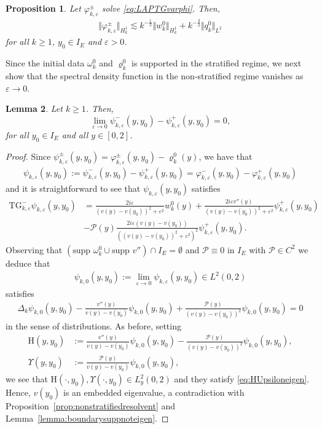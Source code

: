 \documentclass[11pt,reqno]{amsproc}
\newtheorem{proposition}{Proposition}[section]
\newtheorem{lemma}[proposition]{Lemma}
\theoremstyle{definition}
\numberwithin{equation}{section}
\newcommand{\D}{{\Delta}}
\renewcommand{\sp}{{\text{supp }}}
\newcommand{\ep}{\varepsilon}
\renewcommand{\P}{{\mathcal{P}}}
\begin{document}
\begin{proposition}\label{prop:Hk1varphi}
Let $\varphi_{k,\ep}^\pm$ solve \eqref{eq:LAPTGvarphi}. Then,
\begin{align*}
\Vert \varphi_{k,\ep}^\pm \Vert_{H_k^1}\lesssim k^{-\frac13}\Vert w_k^0\Vert_{H_k^1} + k^{-\frac32}\Vert q_k^0 \Vert_{L^2}
\end{align*}
for all $k\geq 1$, $y_0\in I_E$ and $\ep>0$. 
\end{proposition}
Since the initial data $\omega_k^0$ and $\varrho_k^0$ is supported in the stratified regime, we next show that the spectral density function in the non-stratified regime vanishes as $\ep\rightarrow 0$.
\begin{lemma}\label{lemma:vanishingpsiIE}
Let $k\geq 1$. Then,
\begin{equation*}
\lim_{\ep \rightarrow 0}\psi_{k,\ep}^-(y,y_0) - \psi_{k,\ep}^+(y,y_0) = 0,
\end{equation*}
for all $y_0\in I_E$ and all $y\in [0,2]$.
\end{lemma}

\begin{proof}
Since $\psi_{k,\ep}^\pm(y,y_0) = \varphi_{k,\ep}^\pm(y,y_0) - \varrho_k^0(y)$, we have that
\begin{align*}
\psi_{k,\ep}(y,y_0) := \psi_{k,\ep}^-(y,y_0) - \psi_{k,\ep}^+(y,y_0) = \varphi_{k,\ep}^-(y,y_0) - \varphi_{k,\ep}^+(y,y_0)
\end{align*}
and it is straightforward to see that $\psi_{k,\ep}(y,y_0)$ satisfies
\begin{align*}
\text{TG}_{k,\ep}^-\psi_{k,\ep}(y,y_0) &= \frac{2i\ep}{(v(y) - v(y_0))^2 + \ep^2}w_k^0(y) + \frac{2i\ep v''(y)}{(v(y) - v(y_0))^2 + \ep^2}\psi_{k,\ep}^+(y,y_0) \\
&-\P(y)\frac{2i\ep(v(y) - v(y_0))}{((v(y)-v(y_0))^2 + \ep^2)^2}\psi_{k,\ep}^+(y,y_0).
\end{align*}
Observing that $(\sp \omega_k^0 \cup \sp v'' )\cap I_E = \emptyset$ and $\P\equiv 0$ in $I_E$ with $\P\in C^2$ we deduce that
\begin{align*}
\psi_{k,0}(y,y_0) := \lim_{\ep\rightarrow 0}\psi_{k,\ep}(y,y_0) \in L^2(0,2)
\end{align*}
satisfies
\begin{align*}
\D_k\psi_{k,0}(y,y_0) - \frac{v''(y)}{v(y) - v(y_0)}\psi_{k,0}(y,y_0) + \frac{\P(y)}{(v(y) - v(y_0))^2}\psi_{k,0}(y,y_0) = 0
\end{align*}
in the sense of distributions. As before, setting 
\begin{align*}
\mathrm H(y,y_0) &:= \frac{v''(y)}{v(y) - v(y_0)}\psi_{k,0}(y,y_0) - \frac{\P(y)}{(v(y) - v(y_0))^2}\psi_{k,0}(y,y_0), \\ 
\Upsilon(y,y_0) &:= \frac{\P(y)}{v(y) - v(y_0)}\psi_{k,0}(y,y_0),
\end{align*}
we see that $\mathrm H(\cdot,y_0),\Upsilon(\cdot,y_0) \in L^2_y(0,2)$ and they satisfy \eqref{eq:HUpsiloneigen}. Hence, $v(y_0)$ is an embedded eigenvalue, a contradiction with Proposition~\ref{prop:nonstratifiedresolvent} and Lemma~\ref{lemma:boundarysuppnoteigen}.
\end{proof}
\end{document}

